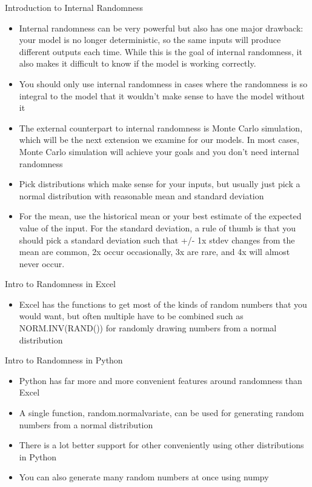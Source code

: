 \documentclass[]{article}
\begin{document}
\begin{section}{Introduction to Internal Randomness}
\begin{itemize}
\item Internal randomness can be very powerful but also has one major drawback: your model is no longer deterministic, so the same inputs will produce different outputs each time. While this is the goal of internal randomness, it also makes it difficult to know if the model is working correctly.
\item You should only use internal randomness in cases where the randomness is so integral to the model that it wouldn't make sense to have the model without it
\item The external counterpart to internal randomness is Monte Carlo simulation, which will be the next extension we examine for our models. In most cases, Monte Carlo simulation will achieve your goals and you don't need internal randomness
\item Pick distributions which make sense for your inputs, but usually just pick a normal distribution with reasonable mean and standard deviation
\item For the mean, use the historical mean or your best estimate of the expected value of the input. For the standard deviation, a rule of thumb is that you should pick a standard deviation such that +/- 1x stdev changes from the mean are common, 2x occur occasionally, 3x are rare, and 4x will almost never occur.
\end{itemize}
\end{section}
\begin{section}{Intro to Randomness in Excel}
\begin{itemize}
\item Excel has the functions to get most of the kinds of random numbers that you would want, but often multiple have to be combined such as NORM.INV(RAND()) for randomly drawing numbers from a normal distribution
\end{itemize}
\end{section}
\begin{section}{Intro to Randomness in Python}
\begin{itemize}
\item Python has far more and more convenient features around randomness than Excel
\item A single function, random.normalvariate, can be used for generating random numbers from a normal distribution
\item There is a lot better support for other conveniently using other distributions in Python
\item You can also generate many random numbers at once using numpy
\end{itemize}
\end{section}
\end{document}
